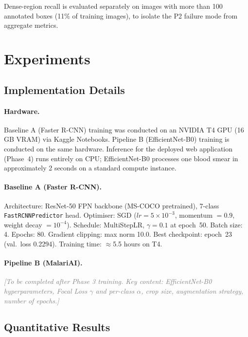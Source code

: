 \documentclass[10pt,twocolumn]{article}
\newcommand{\placeholder}[1]{\textcolor{gray}{\textit{#1}}}
\begin{document}
Dense-region recall is evaluated separately on images with more than 100
annotated boxes (11\% of training images), to isolate the P2 failure
mode from aggregate metrics.

\section{Experiments}
\label{sec:experiments}

\subsection{Implementation Details}
\label{ssec:impl}

\paragraph{Hardware.}
Baseline A (Faster R-CNN) training was conducted on an NVIDIA T4 GPU
(16\,GB VRAM) via Kaggle Notebooks. Pipeline B (EfficientNet-B0) training
is conducted on the same hardware. Inference for the deployed web application
(Phase~4) runs entirely on CPU; EfficientNet-B0 processes one blood smear
in approximately 2 seconds on a standard compute instance.

\paragraph{Baseline A (Faster R-CNN).}
Architecture: ResNet-50 FPN backbone (MS-COCO pretrained), 7-class
\texttt{FastRCNNPredictor} head. Optimiser: SGD ($lr = 5 \times 10^{-3}$,
momentum $= 0.9$, weight decay $= 10^{-4}$). Schedule: MultiStepLR,
$\gamma = 0.1$ at epoch~50. Batch size: 4. Epochs: 80. Gradient clipping:
max norm 10.0. Best checkpoint: epoch~23 (val.\ loss 0.2294). Training
time: $\approx$5.5 hours on T4.

\paragraph{Pipeline B (MalariAI).}
\placeholder{[To be completed after Phase 3 training. Key content:
EfficientNet-B0 hyperparameters, Focal Loss $\gamma$ and per-class $\alpha$,
crop size, augmentation strategy, number of epochs.]}

\subsection{Quantitative Results}
\label{ssec:quant}
\end{document}
